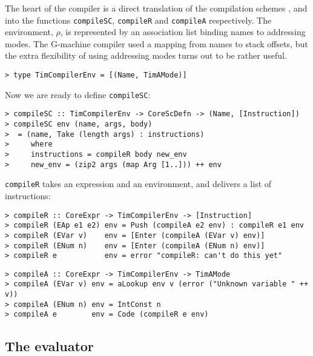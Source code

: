 The heart of the compiler is a direct translation of the compilation
schemes \tSC{}, \tR{} and \tA{} into the functions
\mbox{\tt compileSC}, \mbox{\tt compileR} and \mbox{\tt compileA} respectively.
The environment, $\rho$, is represented by an association list binding
names to addressing modes.  The G-machine compiler used a mapping from
names to stack offsets, but the extra flexibility of using
addressing modes turns out to be rather useful.
\begin{verbatim}
> type TimCompilerEnv = [(Name, TimAMode)]
\end{verbatim}
%
\par
Now we are ready to define \mbox{\tt compileSC}:
\begin{verbatim}
> compileSC :: TimCompilerEnv -> CoreScDefn -> (Name, [Instruction])
> compileSC env (name, args, body)
>  = (name, Take (length args) : instructions)
>     where
>     instructions = compileR body new_env
>     new_env = (zip2 args (map Arg [1..])) ++ env
\end{verbatim}
%
%
\mbox{\tt compileR} takes an expression and an environment, and delivers a list
of instructions:
\begin{verbatim}
> compileR :: CoreExpr -> TimCompilerEnv -> [Instruction]
> compileR (EAp e1 e2) env = Push (compileA e2 env) : compileR e1 env
> compileR (EVar v)    env = [Enter (compileA (EVar v) env)]
> compileR (ENum n)    env = [Enter (compileA (ENum n) env)]
> compileR e           env = error "compileR: can't do this yet"
\end{verbatim}
%
%
%
%
%
\begin{verbatim}
> compileA :: CoreExpr -> TimCompilerEnv -> TimAMode
> compileA (EVar v) env = aLookup env v (error ("Unknown variable " ++ v))
> compileA (ENum n) env = IntConst n
> compileA e        env = Code (compileR e env)
\end{verbatim}
%
%
%
%
\subsection{The evaluator}


